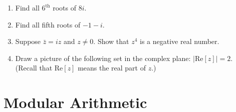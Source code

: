 \begin{enumerate}
%

\item
Find all $6^{\text{th}}$ roots of  $8i$.


\item
Find all fifth roots of $-1-i$.

\item
Suppose $\bar{z} = iz$ and $z \neq 0$. Show that $z^4$ is a negative real number.

\item
Draw a picture of the following set in the complex plane:  $|\textrm{Re}[z] | = 2$.  (Recall that $\textrm{Re}[z]$ means the real part of $z$.)

%

\end{enumerate}



\section{Modular Arithmetic}

